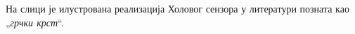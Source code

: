 \PID На слици је илустрована реализација Холовог сензора у литератури позната као „\textit{грчки крст}“. 
